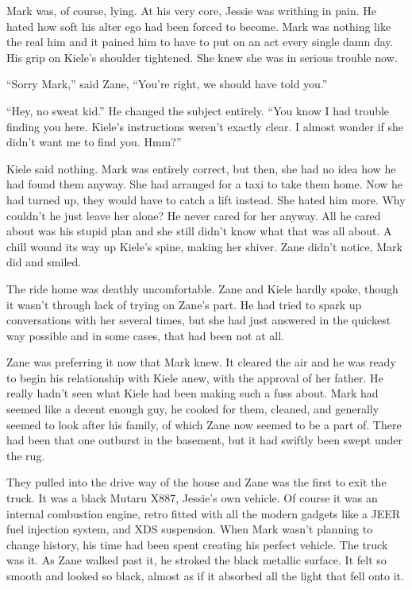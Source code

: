 Mark was, of course, lying.  At his very core, Jessie was writhing in pain.  He hated how soft his alter ego had been forced to become.  Mark was nothing like the real him and it pained him to have to put on an act every single damn day.  His grip on Kiele's shoulder tightened.  She knew she was in serious trouble now.

``Sorry Mark,'' said Zane, ``You're right, we should have told you.''

``Hey, no sweat kid.''  He changed the subject entirely.  ``You know I had trouble finding you here.  Kiele's instructions weren't exactly clear.  I almost wonder if she didn't want me to find you.  Hmm?''

Kiele said nothing.  Mark was entirely correct, but then, she had no idea how he had found them anyway.  She had arranged for a taxi to take them home.  Now he had turned up, they would have to catch a lift instead.  She hated him more.  Why couldn't he just leave her alone?  He never cared for her anyway.  All he cared about was his stupid plan and she still didn't know what that was all about.  A chill wound its way up Kiele's spine, making her shiver.  Zane didn't notice, Mark did and smiled.



\thoughtbreak



The ride home was deathly uncomfortable.  Zane and Kiele hardly spoke, though it wasn't through lack of trying on Zane's part.  He had tried to spark up conversations with her several times, but she had just answered in the quickest way possible and in some cases, that had been not at all.

Zane was preferring it now that Mark knew.  It cleared the air and he was ready to begin his relationship with Kiele anew, with the approval of her father.  He really hadn't seen what Kiele had been making such a fuss about.  Mark had seemed like a decent enough guy, he cooked for them, cleaned, and generally seemed to look after his family, of which Zane now seemed to be a part of.  There had been that one outburst in the basement, but it had swiftly been swept under the rug.

They pulled into the drive way of the house and Zane was the first to exit the truck.  It was a black Mutaru X887, Jessie's own vehicle.  Of course it was an internal combustion engine, retro fitted with all the modern gadgets like a JEER fuel injection system, and XDS suspension.  When Mark wasn't planning to change history, his time had been spent creating his perfect vehicle.  The truck was it.  As Zane walked past it, he stroked the black metallic surface.  It felt so smooth and looked so black, almost as if it absorbed all the light that fell onto it.  

